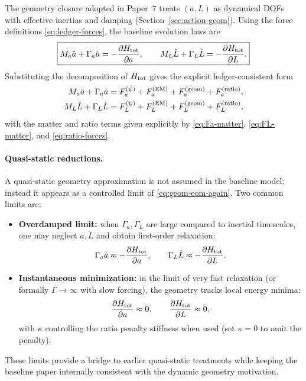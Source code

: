 \documentclass[11pt]{article}
\begin{document}
The geometry closure adopted in Paper~7 treats $(a,L)$ as dynamical DOFs with effective inertias and damping (Section~\ref{sec:action-geom}). Using the force definitions \eqref{eq:ledger-forces}, the baseline evolution laws are
\begin{equation}
\boxed{
M_a \ddot a + \Gamma_a \dot a = -\frac{\partial H_{\rm tot}}{\partial a},
\qquad
M_L \ddot L + \Gamma_L \dot L = -\frac{\partial H_{\rm tot}}{\partial L}.
}
\label{eq:geom-eom-again}
\end{equation}
Substituting the decomposition of $H_{\rm tot}$ gives the explicit ledger-consistent form
\begin{align}
M_a \ddot a + \Gamma_a \dot a
&=
F_a^{(\psi)} + F_a^{({\rm EM})} + F_a^{({\rm geom})} + F_a^{({\rm ratio})},
\\
M_L \ddot L + \Gamma_L \dot L
&=
F_L^{(\psi)} + F_L^{({\rm EM})} + F_L^{({\rm geom})} + F_L^{({\rm ratio})},
\end{align}
with the matter and ratio terms given explicitly by \eqref{eq:Fa-matter}, \eqref{eq:FL-matter}, and \eqref{eq:ratio-forces}.

\paragraph{Quasi-static reductions.}
A quasi-static geometry approximation is not assumed in the baseline model; instead it appears as a controlled limit of \eqref{eq:geom-eom-again}. Two common limits are:
\begin{itemize}[leftmargin=2.0em]
\item \textbf{Overdamped limit:} when $\Gamma_a,\Gamma_L$ are large compared to inertial timescales, one may neglect $\ddot a,\ddot L$ and obtain first-order relaxation:
\begin{equation}
\Gamma_a \dot a \approx -\frac{\partial H_{\rm tot}}{\partial a},
\qquad
\Gamma_L \dot L \approx -\frac{\partial H_{\rm tot}}{\partial L}.
\end{equation}
\item \textbf{Instantaneous minimization:} in the limit of very fast relaxation (or formally $\Gamma\to\infty$ with slow forcing), the geometry tracks local energy minima:
\begin{equation}
\frac{\partial H_{\rm tot}}{\partial a}\approx 0,
\qquad
\frac{\partial H_{\rm tot}}{\partial L}\approx 0,
\end{equation}
with $\kappa$ controlling the ratio penalty stiffness when used (set $\kappa=0$ to omit the penalty).
\end{itemize}
These limits provide a bridge to earlier quasi-static treatments while keeping the baseline paper internally consistent with the dynamic geometry motivation.
\end{document}

